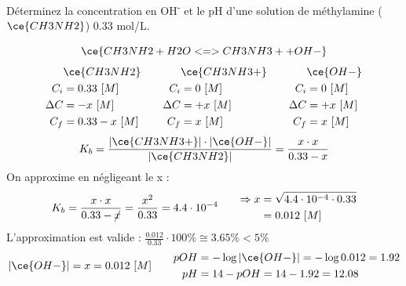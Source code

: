 \documentclass[
  11pt,
  a4paper,
  openany]{book}
\begin{document}
\clearpage

\begin{Exercise}
Déterminez la concentration en OH\textsuperscript{-} et le pH d'une solution de méthylamine (\(\ce{CH3NH2}\)) 0.33 mol/L.

\end{Exercise}

\begin{Answer}
\[
\ce{CH3NH2 + H2O <=> CH3NH3+ + OH-}
\]
\[
\begin{split}
&\ce{CH3NH2}\\
C_i &= 0.33\ [M] \\
\Delta C &= - x\ [M] \\
C_f &= 0.33 - x\ [M] \\
\end{split}
\qquad
\begin{split}
&\ce{CH3NH3+}\\
C_i &= 0\ [M] \\
\Delta C &= + x\ [M] \\
C_f &= x\ [M] \\
\end{split}
\qquad
\begin{split}
&\ce{OH-}\\
C_i &= 0\ [M] \\
\Delta C &= + x\ [M] \\
C_f &= x\ [M] \\
\end{split}
\]
\[
K_b = \frac{|\ce{CH3NH3+}| \cdot |\ce{OH-}|}{|\ce{CH3NH2}|} = \frac{x \cdot x}{0.33 - x}
\]
On approxime en négligeant le x :
\[
\begin{split}
K_b = \frac{x \cdot x}{0.33 - \cancel{x}} = \frac{x^2}{0.33} = 4.4 \cdot 10^{-4}
\end{split}
\qquad
\begin{split}
\Rightarrow x &= \sqrt{4.4 \cdot 10^{-4} \cdot 0.33} \\
  &= 0.012\ [M]
\end{split}
\]
L'approximation est valide : \(\frac{0.012}{0.33} \cdot 100\% \cong 3.65\% < 5\%\)
\[
\begin{split}
|\ce{OH-}| = x = 0.012\ [M] 
\end{split}
\qquad
\begin{split}
pOH &= - \log |\ce{OH-}| = - \log 0.012 = 1.92 \\
pH &= 14 - pOH = 14 - 1.92 = 12.08
\end{split}
\]

\end{Answer}
\end{document}

